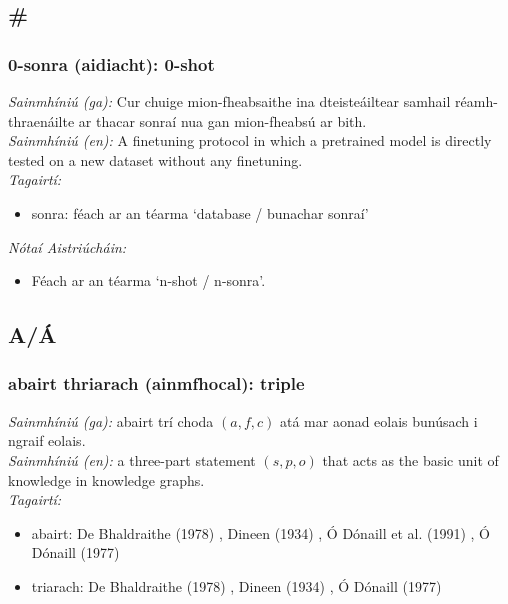 \documentclass{article}
\begin{document}
\subsection*{\#}

\subsubsection*{0-sonra (aidiacht): 0-shot}
 \noindent \textit{Sainmhíniú (ga):} Cur chuige mion-fheabsaithe ina dteisteáiltear samhail réamh-thraenáilte ar thacar sonraí nua gan mion-fheabsú ar bith.
\\
 \noindent \textit{Sainmhíniú (en):} A finetuning protocol in which a pretrained model is directly tested on a new dataset without any finetuning.
\\
 \noindent \textit{Tagairtí:}
\begin{itemize}
	\item sonra: féach ar an téarma `database / bunachar sonraí'
\end{itemize}

 \noindent \textit{Nótaí Aistriúcháin:}
\begin{itemize}
	\item Féach ar an téarma `n-shot / n-sonra'.
\end{itemize}


\subsection*{A/Á}

\subsubsection*{abairt thriarach (ainmfhocal): triple}
 \noindent \textit{Sainmhíniú (ga):} abairt trí choda $(a,f,c)$ atá mar aonad eolais bunúsach i ngraif eolais.
\\
 \noindent \textit{Sainmhíniú (en):} a three-part statement $(s,p,o)$ that acts as the basic unit of knowledge in knowledge graphs.
\\
 \noindent \textit{Tagairtí:}
\begin{itemize}
	\item abairt: De Bhaldraithe (1978) \cite{de-bhaldraithe}, Dineen (1934) \cite{dineen}, Ó Dónaill et al. (1991) \cite{focloir-beag}, Ó Dónaill (1977) \cite{odonaill}
	\item triarach: De Bhaldraithe (1978) \cite{de-bhaldraithe}, Dineen (1934) \cite{dineen}, Ó Dónaill (1977) \cite{odonaill}
\end{itemize}
\end{document}
